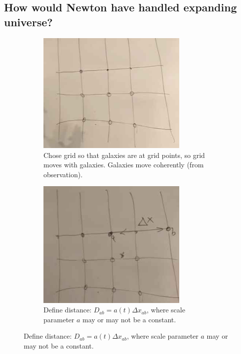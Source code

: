 \documentclass[]{article}
\begin{document}
\subsection{How would Newton have handled expanding universe?}

\begin{figure}[H]
	\begin{center}
		\caption{We start by introducing a set of coordinates.}
		\begin{subfigure}[t]{0.45\textwidth}
			\caption{Chose grid so that galaxies are at grid points, so grid moves with galaxies. Galaxies move coherently (from observation).}\label{fig:cosmo-1-grid}
			\includegraphics[width=0.8\textwidth]{cosmo-1-grid}
		\end{subfigure}
		\;
		\begin{subfigure}[t]{0.45\textwidth}
			\caption{Define distance: $D_{ab}=a(t) \Delta x_{ab}$, where scale parameter $a$ may or may not be a constant.}\label{fig:cosmo-1-distance}
			\includegraphics[width=0.8\textwidth]{cosmo-1-distance}
		\end{subfigure}
	\end{center}
\end{figure}
 
\end{document}
